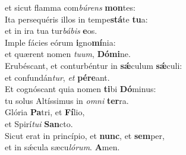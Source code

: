 \oddverse et sicut flamma com\textit{bú}\textit{rens} \textbf{mon}tes:\\
\evenverse Ita persequéris illos in tempe\textbf{stá}te \textbf{tu}a:~\*\\
\evenverse et in ira tua tur\textit{bá}\textit{bis} \textbf{e}os.\\
\oddverse Imple fácies eórum \textbf{i}gno\textbf{mí}nia:~\*\\
\oddverse et quærent nomen \textit{tu}\textit{um}, \textbf{Dó}\textbf{mi}ne.\\
\evenverse Erubéscant, et conturbéntur in \textbf{sǽ}culum \textbf{sǽ}culi:~\*\\
\evenverse et confundán\textit{tur}, \textit{et} \textbf{pé}\textbf{re}ant.\\
\oddverse Et cognóscant quia nomen \textbf{ti}bi \textbf{Dó}minus:~\*\\
\oddverse tu solus Altíssimus in \textit{om}\textit{ni} \textbf{ter}ra.\\
\evenverse Glória \textbf{Pa}tri, et \textbf{Fí}lio,~\*\\
\evenverse et Spirí\textit{tu}\textit{i} \textbf{San}cto.\\
\oddverse Sicut erat in princípio, et \textbf{nunc}, et \textbf{sem}per,~\*\\
\oddverse et in sǽcula sæcu\textit{ló}\textit{rum}. \textbf{A}men.\\

